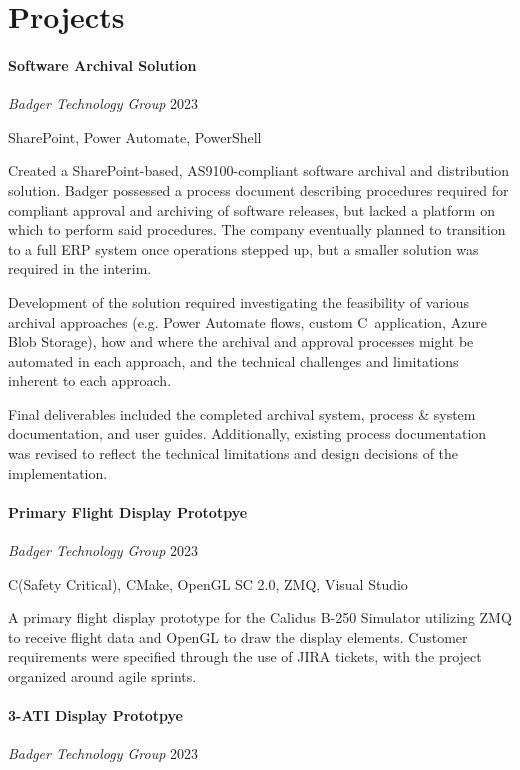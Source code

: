 \documentclass[10pt]{article}
\newcommand{\Rplus}{\protect\raisebox{0.35ex}{\smaller[2]{\textbf{+}}}}
\newcommand{\Rsharp}{\protect\raisebox{0.35ex}{\smaller[2]{\textbf{\#}}}}
\newcommand{\Cpp}{\mbox{C\Rplus\Rplus}}
\newcommand{\Csharp}{\mbox{C\Rsharp}}
\newcommand{\firstpar}{\vspace{4pt}\noindent}
\begin{document}
\section*{Projects}
\paragraph{Software Archival Solution}
\vline\quad \textit{Badger Technology Group} \hfill 2023

\noindent
{\small SharePoint, Power Automate, PowerShell}

\firstpar
Created a SharePoint-based, AS9100-compliant software archival and distribution solution.
Badger possessed a process document describing procedures required for compliant approval
and archiving of software releases, but lacked a platform on which to perform said procedures.
The company eventually planned to transition to a full ERP system once operations
stepped up, but a smaller solution was required in the interim.

Development of the solution required investigating the feasibility of various archival
approaches (e.g. Power Automate flows, custom \Csharp\ application, Azure Blob Storage),
how and where the archival and approval processes might be automated in each approach,
and the technical challenges and limitations inherent to each approach.

Final deliverables included the completed archival system, process \& system documentation,
and user guides. Additionally, existing process documentation was revised to reflect the
technical limitations and design decisions of the implementation.

\paragraph{Primary Flight Display Prototpye}
\vline\quad \textit{Badger Technology Group} \hfill 2023

\noindent
{\small \Cpp (Safety Critical), CMake, OpenGL SC 2.0, ZMQ, Visual Studio}

\firstpar
A primary flight display prototype for the Calidus B-250 Simulator utilizing ZMQ to receive flight
data and OpenGL to draw the display elements. Customer requirements were specified through the use
of JIRA tickets, with the project organized around agile sprints.

\paragraph{3-ATI Display Prototpye}
\vline\quad \textit{Badger Technology Group} \hfill 2023
\end{document}
